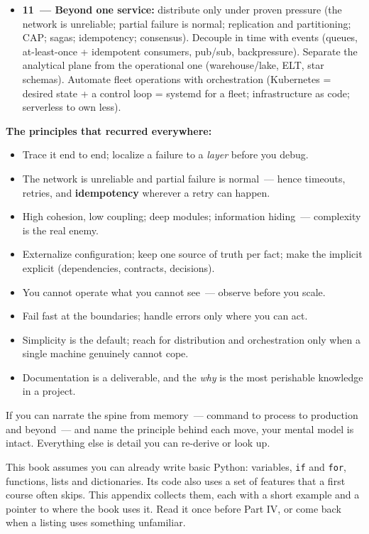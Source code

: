 \begin{itemize}
\item
  \textbf{11~--- Beyond one service:} distribute only under proven pressure (the network is unreliable; partial failure is normal; replication and partitioning; CAP; sagas; idempotency; consensus). Decouple in time with events (queues, at-least-once + idempotent consumers, pub/sub, backpressure). Separate the analytical plane from the operational one (warehouse/lake, ELT, star schemas). Automate fleet operations with orchestration (Kubernetes = desired state + a control loop = systemd for a fleet; infrastructure as code; serverless to own less).
\end{itemize}

\noindent{}\textbf{The principles that recurred everywhere:}

\begin{itemize}
\tightlist
\item
  Trace it end to end; localize a failure to a \emph{layer} before you debug.
\item
  The network is unreliable and partial failure is normal~--- hence timeouts, retries, and \textbf{idempotency} wherever a retry can happen.
\item
  High cohesion, low coupling; deep modules; information hiding~--- complexity is the real enemy.
\item
  Externalize configuration; keep one source of truth per fact; make the implicit explicit (dependencies, contracts, decisions).
\item
  You cannot operate what you cannot see~--- observe before you scale.
\item
  Fail fast at the boundaries; handle errors only where you can act.
\item
  Simplicity is the default; reach for distribution and orchestration only when a single machine genuinely cannot cope.
\item
  Documentation is a deliverable, and the \emph{why} is the most perishable knowledge in a project.
\end{itemize}

\noindent{}If you can narrate the spine from memory~--- command to process to production and beyond~--- and name the principle behind each move, your mental model is intact. Everything else is detail you can re-derive or look up.

\label{ch:44-appendices-7}

\chapterrule

This book assumes you can already write basic Python: variables, \texttt{if} and \texttt{for}, functions, lists and dictionaries. Its code also uses a set of features that a first course often skips. This appendix collects them, each with a short example and a pointer to where the book uses it. Read it once before Part IV, or come back when a listing uses something unfamiliar.

